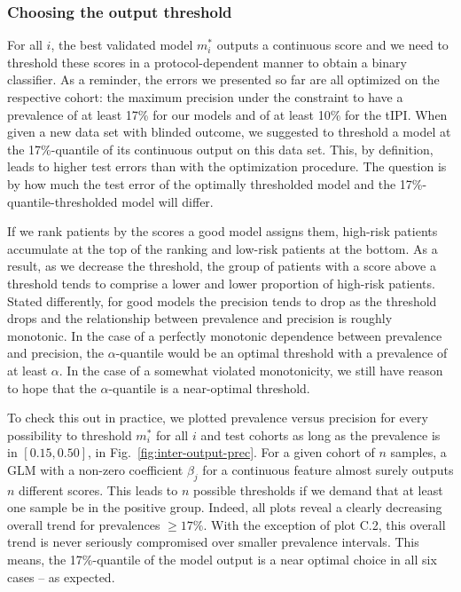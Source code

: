 \subsubsection{Choosing the output threshold}




For all $i$, the best validated model $m_i^*$ outputs a continuous score and we need to threshold 
these scores in a protocol-dependent manner to obtain a binary classifier. As a reminder, the errors 
we presented so far are all optimized on the respective cohort: the maximum precision under the 
constraint to have a prevalence of at least \num{17}\% for our models and of at least \num{10}\% 
for the tIPI. When given a new data set with blinded outcome, we suggested to threshold a model at 
the \num{17}\%-quantile of its continuous output on this data set. This, by definition, leads to 
higher test errors than with the optimization procedure. The question is by how much the test error 
of the optimally thresholded model and the \num{17}\%-quantile-thresholded model will differ.

If we rank patients by the scores a good model assigns them, high-risk patients accumulate at the 
top of the ranking and low-risk patients at the bottom. As a result, as we decrease the threshold, 
the group of patients with a score above a threshold tends to comprise a lower and lower proportion 
of high-risk patients. Stated differently, for good models the precision tends to drop as the 
threshold drops and the relationship between prevalence and precision is roughly monotonic. In the 
case of a perfectly monotonic dependence between prevalence and precision, the $\alpha$-quantile 
would be an optimal threshold with a prevalence of at least $\alpha$. 
In the case of a somewhat violated monotonicity, we still have reason to hope that the 
$\alpha$-quantile is a near-optimal threshold.

To check this out in practice, we plotted prevalence versus precision for every possibility to 
threshold $m^*_i$ for all $i$ and test cohorts as long as the prevalence is in $[\num{0.15}, 
\num{0.50}]$, in Fig.\ \ref{fig:inter-output-prec}. For a given 
cohort of $n$ samples, a GLM with a non-zero coefficient $\beta_j$ for a continuous feature almost 
surely outputs $n$ different scores. This leads to $n$ possible thresholds if we demand that at 
least one sample be in the positive group. Indeed, all 
plots reveal a clearly decreasing overall trend for prevalences $\geq \num{17}\%$. With the 
exception of plot C.2, this overall trend is never seriously compromised over smaller 
prevalence intervals. This means, the \num{17}\%-quantile of the model output is a near optimal 
choice in all six cases -- as expected.

